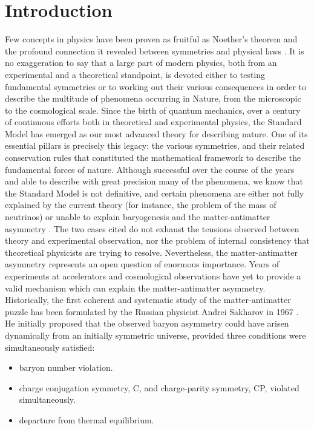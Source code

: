\chapter{Introduction}

Few concepts in physics have been proven as fruitful as Noether's theorem and the profound connection it revealed between symmetries and physical laws \cite{Noether1918}. It is no exaggeration to say that a large part of modern physics, both from an experimental and a theoretical standpoint, is devoted either to testing fundamental symmetries or to working out their various consequences in order to describe the multitude of phenomena occurring in Nature, from the microscopic to the cosmological scale. Since the birth of quantum mechanics, over a century of continuous efforts both in theoretical and experimental physics, the Standard Model has emerged as our most advanced theory for describing nature. One of its essential pillars is precisely this legacy: the various symmetries, and their related conservation rules that constituted the mathematical framework to describe the fundamental forces of nature.
Although successful over the course of the years and able to describe with great precision many of the phenomena, we know that the Standard Model is not definitive, and certain phenomena are either not fully explained by the current theory (for instance, the problem of the mass of neutrinos) or unable to explain baryogenesis and the matter-antimatter asymmetry \cite{Dine_2003}. The two cases cited do not exhaust the tensions observed between theory and experimental observation, nor the problem of internal consistency that theoretical physicists are trying to resolve. Nevertheless, the matter-antimatter asymmetry represents an open question of enormous importance. Years of experiments at accelerators and cosmological observations have yet to provide a valid mechanism which can explain the matter-antimatter asymmetry.
Historically, the first coherent and systematic study of the matter-antimatter puzzle has been formulated by the Russian physicist Andrei Sakharov in 1967 \cite{Sakharov1967}. He initially proposed that the observed baryon asymmetry could have arisen dynamically from an initially symmetric universe, provided three conditions were simultaneously satisfied:

\begin{itemize}
\item baryon number violation.
\item charge conjugation symmetry, C, and charge-parity symmetry, CP, violated simultaneously.
\item departure from thermal equilibrium.
\end{itemize}

